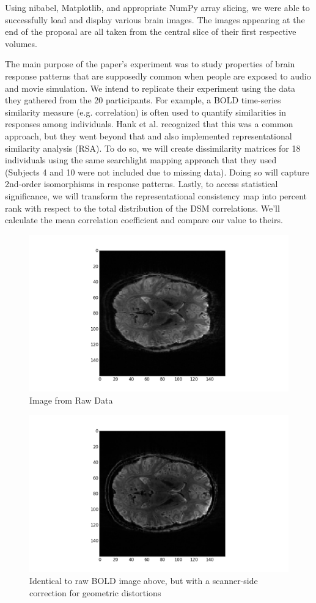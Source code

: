 \documentclass[11pt]{article}
\begin{document}
Using nibabel, Matplotlib, and appropriate NumPy array slicing, we were able to
successfully load and display various brain images. The images appearing at the
end of the proposal are all taken from the central slice of their first
respective volumes.

The main purpose of the paper's experiment was to study properties of brain
response
patterns that are supposedly common when people are exposed to audio and movie
simulation. We intend to replicate their experiment using the data they gathered
from the 20 participants. For example, a BOLD time-series similarity measure
(e.g. correlation) is often used to quantify similarities in responses among
individuals. Hank et al. recognized that this was a common approach, but they
went beyond that and also implemented representational similarity analysis 
(RSA). To do so, we will create dissimilarity matrices for 18 individuals using
the same
searchlight mapping approach that they used (Subjects 4 and 10 were not included
due to missing data). Doing so will capture 2nd-order isomorphisms in response
patterns. Lastly, to access statistical significance, we will transform the
representational consistency map into percent rank with respect to the total
distribution of the DSM correlations. We'll calculate the mean correlation
coefficient and compare our value to theirs.
\begin{figure}[h]
\caption{Image from Raw Data}
\includegraphics[scale=.5]{image_1}
\centering
\end{figure}
\begin{figure}[h]
\caption{Identical to raw BOLD image above, but with a scanner-side correction
for geometric
distortions}
\includegraphics[scale=.5]{image_2}
\centering
\end{figure}
\end{document}

